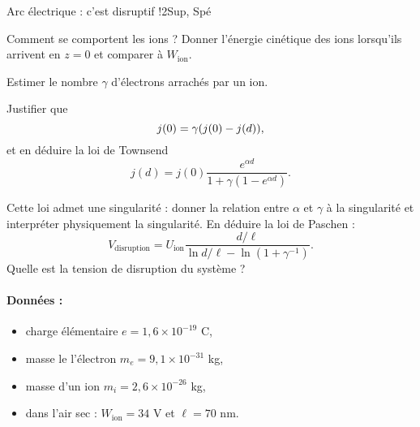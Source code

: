 \begin{exercise}{Arc électrique : c'est disruptif !}{2}{Sup, Spé}
\begin{questions}
\question Comment se comportent les ions ? Donner l'énergie cinétique des ions lorsqu'ils arrivent en $z=0$ et comparer à $W_\text{ion}$.


\question Estimer le nombre $\gamma$ d'électrons arrachés par  un ion.

\question Justifier que
$$j(0) = \gamma\qty(j(0) - j(d)),$$
et en déduire la loi de Townsend
$$j(d) = j(0) \dfrac{e^{\alpha d}}{1 + \gamma(1 - e^{\alpha d})}.$$

\question Cette loi admet une singularité : donner la relation entre $\alpha$ et $\gamma$ à la singularité et interpréter physiquement la singularité.
\question En déduire la loi de Paschen :
$$V_\text{disruption} = U_\text{ion}\dfrac{d/\ell}{\ln{d/\ell} - \ln(1+\gamma^{-1})}.$$
Quelle est la tension de disruption du système ?
\end{questions}

\paragraph{Données :}
\begin{itemize}
    \item charge élémentaire $e = 1,6\times 10^{-19}$ C,
    \item masse le l'électron $m_e = 9,1\times 10^{-31}$ kg,
    \item masse d'un ion $m_i = 2,6\times 10^{-26}$ kg,
    \item dans l'air sec : $W_\text{ion} = 34$ V et $\ell = 70$ nm.
\end{itemize}
\end{exercise} 
